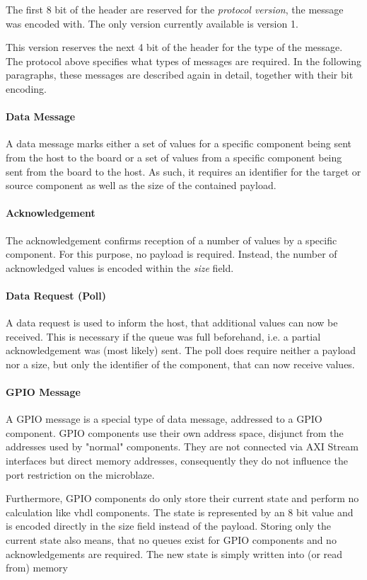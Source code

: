 \documentclass{report}
\begin{document}
The first 8 bit of the header are reserved for the \textit{protocol version}, the message was encoded with. The only version currently available is version 1.

This version reserves the next 4 bit of the header for the type of the message. The protocol above specifies what types of messages are required. In the following paragraphs, these messages are described again in detail, together with their bit encoding.

\paragraph{Data Message}
A data message marks either a set of values for a specific component being sent from the host to the board or a set of values from a specific component being sent from the board to the host. As such, it requires an identifier for the target or source component as well as the size of the contained payload.

\paragraph{Acknowledgement}
The acknowledgement confirms reception of a number of values by a specific component. For this purpose, no payload is required. Instead, the number of acknowledged values is encoded within the \textit{size} field.

\paragraph{Data Request (Poll)}
A data request is used to inform the host, that additional values can now be received. This is necessary if the queue was full beforehand, i.e. a partial acknowledgement was (most likely) sent. The poll does require neither a payload nor a size, but only the identifier of the component, that can now receive values.

\paragraph{GPIO Message}
A GPIO message is a special type of data message, addressed to a GPIO component. GPIO components use their own address space, disjunct from the addresses used by "normal" components. They are not connected via AXI Stream interfaces but direct memory addresses, consequently they do not influence the port restriction on the microblaze.

Furthermore, GPIO components do only store their current state and perform no calculation like vhdl components. The state is represented by an 8 bit value and is encoded directly in the size field instead of the payload. Storing only the current state also means, that no queues exist for GPIO components and no acknowledgements are required. The new state is simply written into (or read from) memory
\end{document}
